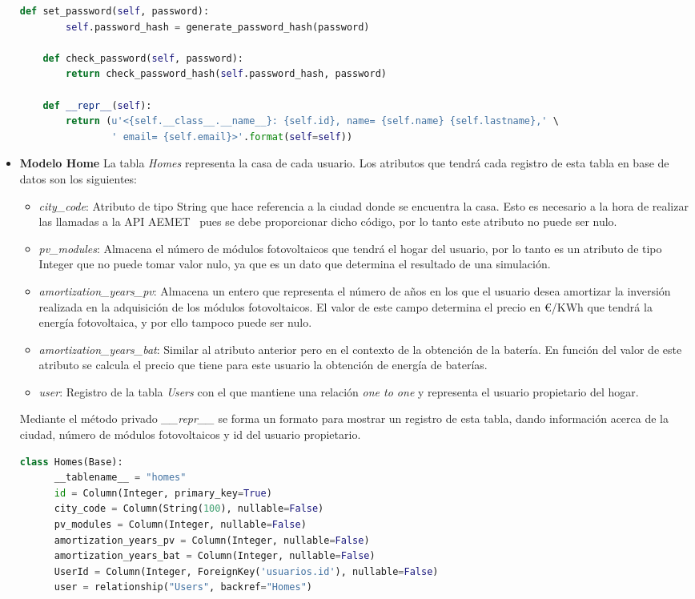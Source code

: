 \begin{itemize}
\begin{lstlisting}[language=Python,float=ht,caption={Modelo \textit{User}},label={lst:modelUser}]
    def set_password(self, password):
        self.password_hash = generate_password_hash(password)

    def check_password(self, password):
        return check_password_hash(self.password_hash, password)

    def __repr__(self):
        return (u'<{self.__class__.__name__}: {self.id}, name= {self.name} {self.lastname},' \
                ' email= {self.email}>'.format(self=self))
\end{lstlisting}
\item \textbf{Modelo Home}
La tabla \textit{Homes} representa la casa de cada usuario. Los atributos que tendrá cada registro de esta tabla en base de datos son los siguientes:
\begin{itemize}
\item \textit{city\_code}: Atributo de tipo String que hace referencia a la ciudad donde se encuentra la casa. Esto es necesario a la hora de realizar las llamadas a la API AEMET~\cite{Aemet} pues se debe proporcionar dicho código, por lo tanto este atributo no puede ser nulo.
\item \textit{pv\_modules}: Almacena el número de módulos fotovoltaicos que tendrá el hogar del usuario, por lo tanto es un atributo de tipo Integer que no puede tomar valor nulo, ya que es un dato que determina el resultado de una simulación.
\item \textit{amortization\_years\_pv}: Almacena un entero que representa el número de años en los que el usuario desea amortizar la inversión realizada en la adquisición de los módulos fotovoltaicos. El valor de este campo determina el precio en €/KWh que tendrá la energía fotovoltaica, y por ello tampoco puede ser nulo.
\item \textit{amortization\_years\_bat}: Similar al atributo anterior pero en el contexto de la obtención de la batería. En función del valor de este atributo se calcula el precio que tiene para este usuario la obtención de energía de baterías.
\item \textit{user}: Registro de la tabla \textit{Users} con el que mantiene una relación \textit{one to one} y representa el usuario propietario del hogar.
\end{itemize}
Mediante el método privado \textit{\_\_repr\_\_} se forma un formato para mostrar un registro de esta tabla, dando información acerca de la ciudad, número de módulos fotovoltaicos y id del usuario propietario.
\begin{lstlisting}[language=Python,float=ht,caption={Modelo \textit{Home}},label={lst:modelHome}]
class Homes(Base):
      __tablename__ = "homes"
      id = Column(Integer, primary_key=True)
      city_code = Column(String(100), nullable=False)
      pv_modules = Column(Integer, nullable=False)
      amortization_years_pv = Column(Integer, nullable=False)
      amortization_years_bat = Column(Integer, nullable=False)
      UserId = Column(Integer, ForeignKey('usuarios.id'), nullable=False)
      user = relationship("Users", backref="Homes")


\end{lstlisting}
\end{itemize}
